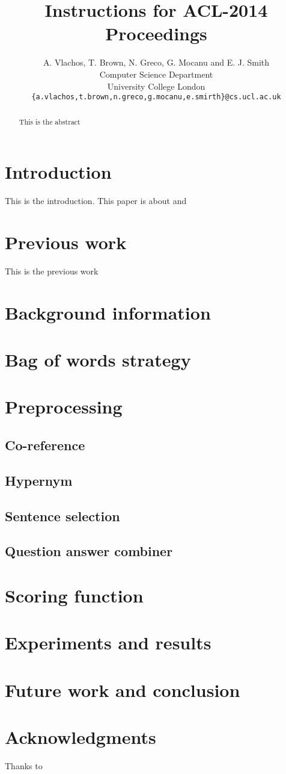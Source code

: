 \documentclass[11pt]{article}
\title{Instructions for ACL-2014 Proceedings}
\author
       {A. Vlachos, T. Brown, N. Greco, G. Mocanu and E. J. Smith
       \\
       Computer Science Department\\
	University College London\\
       \tt{\{a.vlachos,t.brown,n.greco,g.mocanu,e.smirth\}@cs.ucl.ac.uk}\\ 
       }
\date{}
\begin{document}
\maketitle
\begin{abstract}
  This is the abstract
\end{abstract}

\section{Introduction}

This is the introduction. This paper is about \cite{mctest} and 

\section{Previous work}

This is the previous work

\section{Background information}

\section{Bag of words strategy}

\section{Preprocessing}
\subsection{Co-reference}
\subsection{Hypernym}
\subsection{Sentence selection}
\subsection{Question answer combiner}

\section{Scoring function}

\section{Experiments and results}

\section{Future work and conclusion}

\section*{Acknowledgments}

Thanks to



\end{document}
